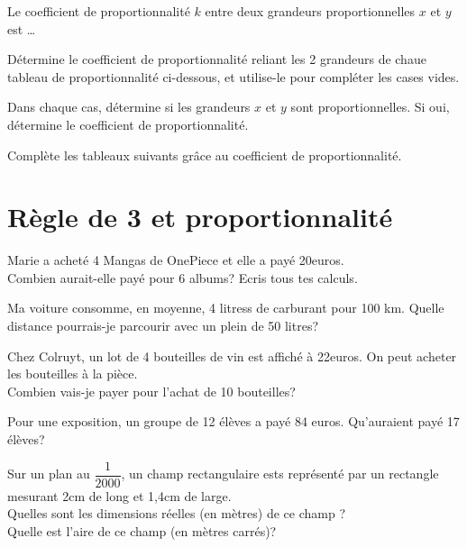 \documentclass[../math2.tex]{subfiles}
\begin{document}
Le coefficient de proportionnalité $k$ entre deux grandeurs
proportionnelles $x$ et $y$ est \dots

\exemple 

\begin{exercise}
  Détermine le coefficient de proportionnalité reliant les 2 grandeurs de chaue tableau de proportionnalité ci-dessous, et utilise-le pour compléter les cases vides.
\end{exercise}

\begin{exercise}
  Dans chaque cas, détermine si les grandeurs $x$ et $y$ sont proportionnelles. Si oui, détermine le coefficient de proportionnalité.
\end{exercise}

\begin{exercise}
  Complète les tableaux suivants grâce au coefficient de proportionnalité.
\end{exercise}

\section{Règle de 3 et proportionnalité }

\begin{exercise}
  Marie a acheté 4 Mangas de OnePiece et elle a payé 20euros. \\
  Combien aurait-elle payé pour 6 albums? Ecris tous tes calculs.
\end{exercise}

\begin{exercise}
  Ma voiture consomme, en moyenne, 4 litress de carburant pour 100 km. Quelle distance pourrais-je parcourir avec un plein de 50 litres? 
\end{exercise}

\begin{exercise}
  Chez Colruyt, un lot de 4 bouteilles de vin est affiché à 22euros. On peut acheter les bouteilles à la pièce. \\
  Combien vais-je payer pour l'achat de 10 bouteilles? 
\end{exercise}

\begin{exercise}
  Pour une exposition, un groupe de 12 élèves a payé 84 euros. Qu'auraient payé 17 élèves?
\end{exercise}

\begin{exercise}
  Sur un plan au $\dfrac{1}{2000}$, un champ rectangulaire ests représenté par un rectangle mesurant 2cm de long et 1,4cm de large. \\
  Quelles sont les dimensions réelles (en mètres)  de ce champ ? \\
  Quelle est l'aire de ce champ (en mètres carrés)?
\end{exercise}
\end{document}
